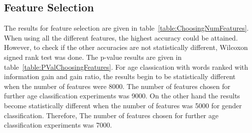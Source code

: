 \documentclass[a4paper]{llncs}
\begin{document}
\subsection{Feature Selection}
The results for feature selection are given in table~\ref{table:ChoosingNumFeatures}. When using all the different features, the highest accuracy could be attained. However, to check if the other accuracies are not statistically different, Wilcoxon signed rank test was done. The p-value results are given in table~\ref{table:PValChoosingFeatures}. For age classication with words ranked with information gain and gain ratio, the results begin to be statistically different when the number of features were 8000. The number of features chosen for further age classification experiments was 9000. On the other hand the results become statistically different when the number of features was 5000 for gender classification. Therefore, The number of features chosen for further age classification experiments was 7000. 
\end{document}
